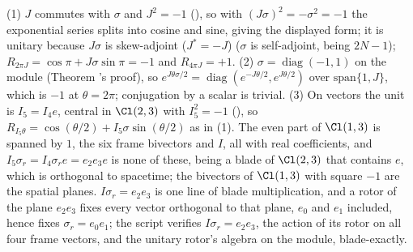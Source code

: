 (1) $J$ commutes with $\sigma$ and $J^{2} = -1$ (), so with $(J\sigma)^{2} = -\sigma^{2} = -1$ the exponential series splits into cosine and sine, giving the displayed form; it is unitary because $J\sigma$ is skew-adjoint ($J^{*} = -J$) ($\sigma$ is self-adjoint, being $2N - 1$); $R_{2\pi J} = \cos\pi + J\sigma\sin\pi = -1$ and $R_{4\pi J} = +1$. (2) $\sigma = \operatorname{diag}(-1, 1)$ on the module (Theorem 's proof), so $e^{J\theta\sigma/2} = \operatorname{diag}(e^{-J\theta/2}, e^{J\theta/2})$ over $\mathrm{span}\{1, J\}$, which is $-1$ at $\theta = 2\pi$; conjugation by a scalar is trivial. (3) On vectors the unit is $I_{5} = I_{4}e$, central in $\Cl(2,3)$ with $I_{5}^{2} = -1$ (), so $R_{I_{5}\theta} = \cos(\theta/2) + I_{5}\sigma\sin(\theta/2)$ as in (1). The even part of $\Cl(1,3)$ is spanned by $1$, the six frame bivectors and $I$, all with real coefficients, and $I_{5}\sigma_r = I_{4}\sigma_{r}e = e_{2}e_{3}e$ is none of these, being a blade of $\Cl(2,3)$ that contains $e$, which is orthogonal to spacetime; the bivectors of $\Cl(1,3)$ with square $-1$ are the spatial planes. $I\sigma_r = e_2e_3$ is one line of blade multiplication, and a rotor of the plane $e_2e_3$ fixes every vector orthogonal to that plane, $e_0$ and $e_1$ included, hence fixes $\sigma_r = e_0e_1$; the script verifies $I\sigma_r = e_2e_3$, the action of its rotor on all four frame vectors, and the unitary rotor's algebra on the module, blade-exactly.
